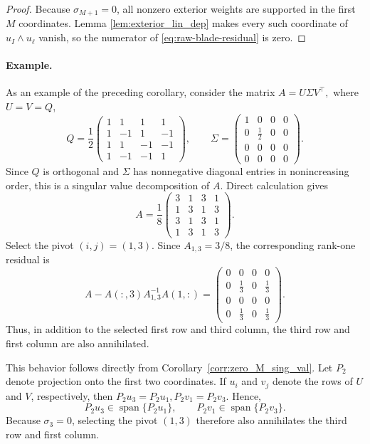 \documentclass[11pt, preprint]{article}
\begin{document}
\begin{proof}
Because $\sigma_{M+1}=0$, all nonzero exterior weights are supported in the first $M$ coordinates. Lemma \ref{lem:exterior_lin_dep} makes every such coordinate of $u_I\wedge u_\ell$ vanish, so the numerator of \eqref{eq:raw-blade-residual} is zero.
\end{proof}

\paragraph{Example.}
As an example of the preceding corollary, consider the matrix
\(
    A=U\Sigma V^\top,
\)
where $U=V=Q$,
\[
Q=
\frac{1}{2}
\begin{pmatrix}
1 & 1 & 1 & 1\\
1 & -1 & 1 & -1\\
1 & 1 & -1 & -1\\
1 & -1 & -1 & 1
\end{pmatrix},
\qquad
\Sigma=
\begin{pmatrix}
1 & 0 & 0 & 0\\
0 & \frac12 & 0 & 0\\
0 & 0 & 0 & 0\\
0 & 0 & 0 & 0
\end{pmatrix}.
\]
Since $Q$ is orthogonal and $\Sigma$ has nonnegative diagonal
entries in nonincreasing order, this is a singular value
decomposition of $A$. Direct calculation gives
\[
A=
\frac{1}{8}\begin{pmatrix}
3 & 1 & 3 & 1\\
1 & 3 & 1 & 3\\
3 & 1 & 3 & 1\\
1 & 3 & 1 & 3
\end{pmatrix}.
\]
Select the pivot $(i,j)=(1,3)$. Since $A_{1,3}=3/8$, the
corresponding rank-one residual is
\[
A-A(:,3)A_{1,3}^{-1}A(1,:)
=
\begin{pmatrix}
0 & 0 & 0 & 0\\
0 & \frac13 & 0 & \frac13\\
0 & 0 & 0 & 0\\
0 & \frac13 & 0 & \frac13
\end{pmatrix}.
\]
Thus, in addition to the selected first row and third column, the
third row and first column are also annihilated.

This behavior follows directly from
Corollary~\ref{corr:zero_M_sing_val}. Let $P_2$ denote projection
onto the first two coordinates. If $u_i$ and $v_j$ denote the rows
of $U$ and $V$, respectively, then \(P_2u_3=P_2u_1,  P_2v_1=P_2v_3. \)
Hence,
\[
    P_2u_3\in\operatorname{span}\{P_2u_1\},
    \qquad
    P_2v_1\in\operatorname{span}\{P_2v_3\}.
\]
Because $\sigma_3=0$, selecting the pivot $(1,3)$ therefore also
annihilates the third row and first column.
\end{document}
